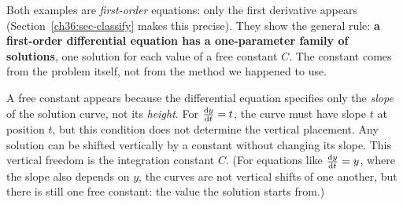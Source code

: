Both examples are \emph{first-order} equations: only the first derivative appears (Section~\ref{ch36:sec-classify} makes this precise). They show the general rule: \textbf{a first-order differential equation has a one-parameter family of solutions}, one solution for each value of a free constant $C$. The constant comes from the problem itself, not from the method we happened to use.

\begin{whybox}
A free constant appears because the differential equation specifies only the \emph{slope} of the solution curve, not its \emph{height}. For $\frac{\mathrm{d} y}{\mathrm{d} t} = t$, the curve must have slope $t$ at position $t$, but this condition does not determine the vertical placement. Any solution can be shifted vertically by a constant without changing its slope. This vertical freedom is the integration constant $C$. (For equations like $\frac{\mathrm{d} y}{\mathrm{d} t}=y$, where the slope also depends on $y$, the curves are not vertical shifts of one another, but there is still one free constant: the value the solution starts from.)
\end{whybox}

